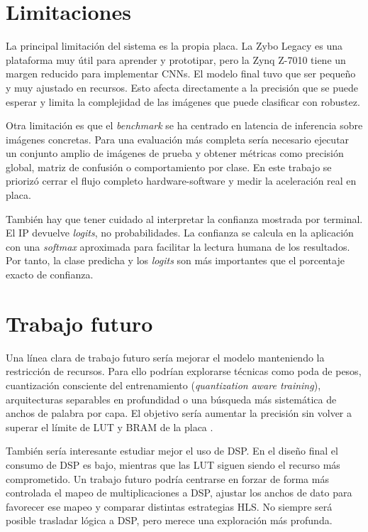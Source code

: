\section{Limitaciones}

La principal limitación del sistema es la propia placa. La Zybo Legacy es una plataforma muy útil
para aprender y prototipar, pero la Zynq Z-7010 tiene un margen reducido para implementar CNNs. El
modelo final tuvo que ser pequeño y muy ajustado en recursos. Esto afecta directamente a la
precisión que se puede esperar y limita la complejidad de las imágenes que puede clasificar con
robustez.

Otra limitación es que el \textit{benchmark} se ha centrado en latencia de inferencia sobre imágenes
concretas. Para una evaluación más completa sería necesario ejecutar un conjunto amplio de imágenes
de prueba y obtener métricas como precisión global, matriz de confusión o comportamiento por clase.
En este trabajo se priorizó cerrar el flujo completo hardware-software y medir la aceleración real
en placa.

También hay que tener cuidado al interpretar la confianza mostrada por terminal. El \ac{IP} devuelve
\textit{logits}, no probabilidades. La confianza se calcula en la aplicación con una
\textit{softmax} aproximada para
facilitar la lectura humana de los resultados. Por tanto, la clase predicha y los
\textit{logits} son más
importantes que el porcentaje exacto de confianza.

\section{Trabajo futuro}

Una línea clara de trabajo futuro sería mejorar el modelo manteniendo la restricción de recursos.
Para ello podrían explorarse técnicas como poda de pesos, cuantización consciente del entrenamiento
(\textit{quantization aware training}), arquitecturas separables en profundidad o una búsqueda más
sistemática de anchos de palabra por capa. El objetivo sería aumentar la precisión sin volver a
superar el límite de \ac{LUT} y \ac{BRAM} de la placa
\citep{han2015deep,howard2017mobilenetsefficientconvolutionalneural}.

También sería interesante estudiar mejor el uso de \ac{DSP}. En el diseño final el consumo de DSP es
bajo, mientras que las \ac{LUT} siguen siendo el recurso más comprometido. Un trabajo futuro podría
centrarse en forzar de forma más controlada el mapeo de multiplicaciones a \ac{DSP},
ajustar los anchos
de dato para favorecer ese mapeo y comparar distintas estrategias \ac{HLS}. No siempre será posible
trasladar lógica a \ac{DSP}, pero merece una exploración más profunda.

